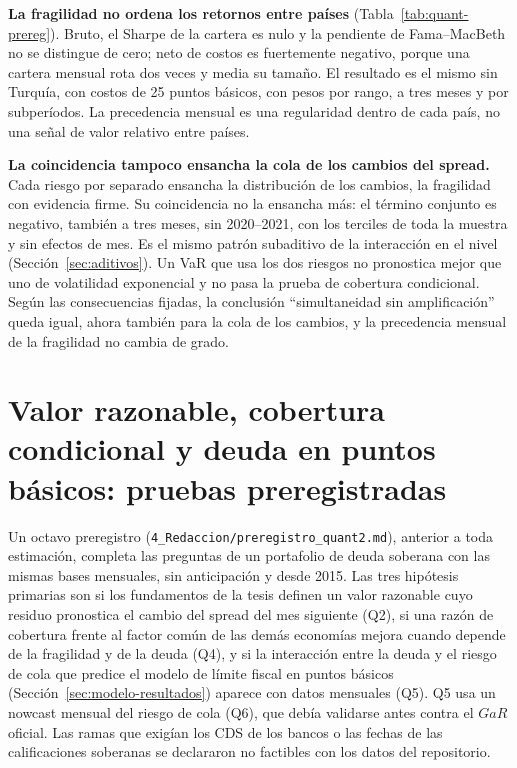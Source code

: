 \textbf{La fragilidad no ordena los retornos entre países} (Tabla~\ref{tab:quant-prereg}). Bruto, el Sharpe de la cartera es nulo y la pendiente de Fama--MacBeth no se distingue de cero; neto de costos es fuertemente negativo, porque una cartera mensual rota dos veces y media su tamaño. El resultado es el mismo sin Turquía, con costos de 25 puntos básicos, con pesos por rango, a tres meses y por subperíodos. La precedencia mensual es una regularidad dentro de cada país, no una señal de valor relativo entre países.

\textbf{La coincidencia tampoco ensancha la cola de los cambios del spread.} Cada riesgo por separado ensancha la distribución de los cambios, la fragilidad con evidencia firme. Su coincidencia no la ensancha más: el término conjunto es negativo, también a tres meses, sin 2020--2021, con los terciles de toda la muestra y sin efectos de mes. Es el mismo patrón subaditivo de la interacción en el nivel (Sección~\ref{sec:aditivos}). Un VaR que usa los dos riesgos no pronostica mejor que uno de volatilidad exponencial y no pasa la prueba de cobertura condicional. Según las consecuencias fijadas, la conclusión ``simultaneidad sin amplificación'' queda igual, ahora también para la cola de los cambios, y la precedencia mensual de la fragilidad no cambia de grado.

\section{Valor razonable, cobertura condicional y deuda en puntos básicos: pruebas preregistradas}
\label{sec:quant2-prereg}

Un octavo preregistro (\texttt{4\_Redaccion/preregistro\_quant2.md}), anterior a toda estimación, completa las preguntas de un portafolio de deuda soberana con las mismas bases mensuales, sin anticipación y desde 2015. Las tres hipótesis primarias son si los fundamentos de la tesis definen un valor razonable cuyo residuo pronostica el cambio del spread del mes siguiente (Q2), si una razón de cobertura frente al factor común de las demás economías mejora cuando depende de la fragilidad y de la deuda (Q4), y si la interacción entre la deuda y el riesgo de cola que predice el modelo de límite fiscal en puntos básicos (Sección~\ref{sec:modelo-resultados}) aparece con datos mensuales (Q5). Q5 usa un nowcast mensual del riesgo de cola (Q6), que debía validarse antes contra el $GaR$ oficial. Las ramas que exigían los CDS de los bancos o las fechas de las calificaciones soberanas se declararon no factibles con los datos del repositorio.

